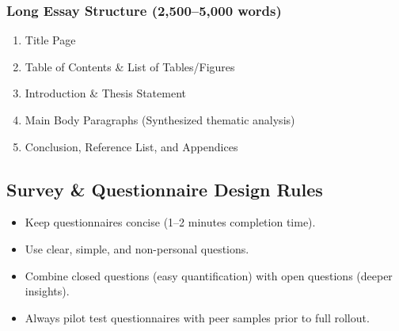 \documentclass[11pt, a4paper]{article}
\begin{document}
\subsubsection{Long Essay Structure (2,500--5,000 words)}
\begin{enumerate}
    \item Title Page
    \item Table of Contents \& List of Tables/Figures
    \item Introduction \& Thesis Statement
    \item Main Body Paragraphs (Synthesized thematic analysis)
    \item Conclusion, Reference List, and Appendices
\end{enumerate}

\subsection{Survey \& Questionnaire Design Rules}
\begin{itemize}
    \item Keep questionnaires concise (1--2 minutes completion time).
    \item Use clear, simple, and non-personal questions.
    \item Combine closed questions (easy quantification) with open questions (deeper insights).
    \item Always pilot test questionnaires with peer samples prior to full rollout.
\end{itemize}
\end{document}
